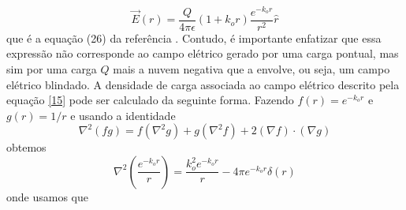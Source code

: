 \documentclass[brazilian,10.7pt,a4paper]{article}
\begin{document}
\begin{multicols}{2}
\\
\begin{equation}\label{15}
\vec{E}(r)=\frac{Q}{4\pi\epsilon}(1+k_{o}r)\frac{e^{-k_{o}r}}{r^{2}}\hat{r}
\end{equation}
que é a equação (26) da referência \cite{ramos}. Contudo, é importante enfatizar que essa expressão não corresponde ao campo elétrico gerado por uma carga pontual, mas sim por uma carga $Q$ mais a nuvem negativa que a envolve, ou seja, um campo elétrico blindado. A densidade de carga associada ao campo elétrico descrito pela equação \eqref{15} pode ser calculado da seguinte forma. Fazendo $f(r)=e^{-k_{o}r}$ e $g(r) = 1/r$ e usando a identidade
\\
\begin{equation}\label{16}
\nabla^{2}(fg)=f(\nabla^{2}g)+g(\nabla^{2}f)+2(\nabla f)\cdot(\nabla g)
\end{equation}
obtemos
\\
\begin{equation}\label{17}
\nabla^{2}\left(\frac{e^{-k_{o}r}}{r}\right)=\frac{k^{2}_{o}e^{-k_{o}r}}{r}-4\pi e^{-k_{o}r}\delta(r)
\end{equation}
onde usamos que

\end{multicols} %
\twocolumn		%
\end{document}
